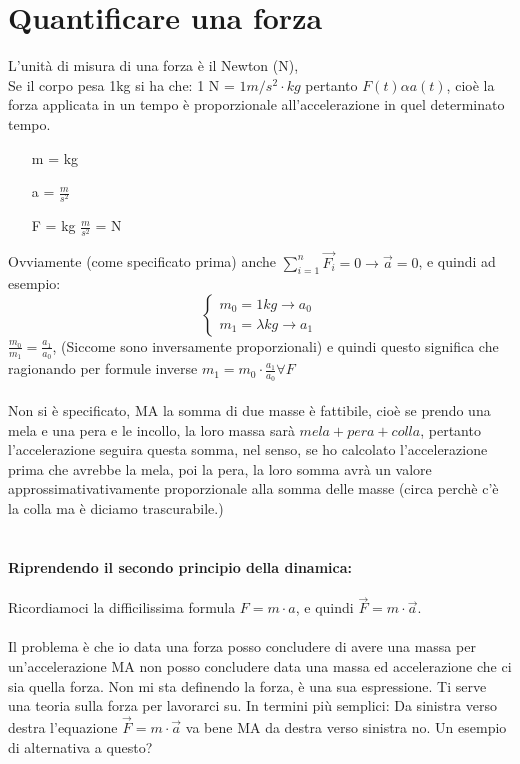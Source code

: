 \documentclass[12pt, a4paper, openany, oneside]{book}
\begin{document}
\section{Quantificare una forza}
L'unità di misura di una forza è il Newton (N), \\
Se il corpo pesa 1kg si ha che: 1 N = $1m/s^{2}\cdot kg$ pertanto $F(t) \alpha a(t)$,
cioè la forza applicata in un tempo è proporzionale all'accelerazione in quel
determinato tempo. 
\begin{itemize}
	\item [m] = kg
	\item [a] = $\frac{m}{s^{2}}$
	\item [F] = kg $\frac{m}{s^{2}}$ = N 
\end{itemize}
Ovviamente (come specificato prima) anche $\sum_{i=1}^n
\overrightarrow{F_{i}} = 0 \to \overrightarrow{a} = 0$, e quindi ad esempio:
\[
\begin{cases}
m_{0} = 1kg \to a_{0}\\
m_{1} = \lambda kg \to a_{1}
\end{cases}
\]
$\frac{m_{0}}{m_{1}} = \frac{a_{1}}{a_{0}}$, (Siccome sono inversamente proporzionali)
e quindi questo significa che 
ragionando per formule inverse $m_{1} = m_{0}\cdot \frac{a_{1}}{a_{0}} \forall F$
\\ \\
Non si è specificato, MA la somma di due masse è fattibile, cioè se prendo 
una mela e una pera e le incollo, la loro massa sarà $mela + pera + colla$, 
pertanto l'accelerazione seguira questa somma, nel senso, se ho calcolato
l'accelerazione prima che avrebbe la mela, poi la pera, la loro somma avrà un 
valore approssimativativamente proporzionale alla somma delle masse (circa perchè
c'è la colla ma è diciamo trascurabile.)
\\ \\
\paragraph{Riprendendo il secondo principio della dinamica: }
Ricordiamoci la difficilissima formula $F = m \cdot a $, e quindi 
$\overrightarrow{F} = m \cdot \overrightarrow{a}$. \\ \\
Il problema è che io data una forza posso concludere di avere una massa per un'accelerazione MA
non posso concludere data una massa ed accelerazione che ci sia quella forza.
Non mi sta definendo la forza, è una sua espressione. Ti serve una teoria sulla
forza per lavorarci su. In termini più semplici: Da sinistra verso destra l'equazione 
$\overrightarrow{F} = m \cdot \overrightarrow{a}$ va bene MA da destra verso
sinistra no. Un esempio di alternativa a questo? 
\end{document}
